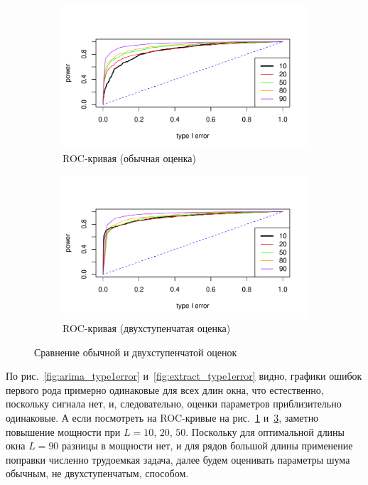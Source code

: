 \documentclass[specialist,
substylefile = spbu_report.rtx,
subf,href,colorlinks=true, 12pt]{disser}
\theoremstyle{definition}
\begin{document}
\begin{figure}[h!]
\begin{subfigure}[t]{0.5\textwidth}
		\includegraphics[width=\textwidth]{img/roc_arima.pdf}
		\caption{ROC-кривая (обычная оценка)}
		\label{fig:arima_roc}
	\end{subfigure}\hspace{\fill}
	\begin{subfigure}[t]{0.5\textwidth}
		\centering
		\includegraphics[width=\textwidth]{img/roc_extract.pdf}
		\caption{ROC-кривая (двухступенчатая оценка)}
		\label{fig:extract_roc}
	\end{subfigure}
	\caption{Сравнение обычной и двухступенчатой оценок}
\end{figure}

По рис.~\ref{fig:arima_type1error} и~\ref{fig:extract_type1error} видно, графики ошибок первого рода примерно одинаковые для всех длин окна, что естественно, поскольку сигнала нет, и, следовательно, оценки параметров приблизительно одинаковые. А если посмотреть на ROC-кривые на рис.~\ref{fig:arima_roc} и~\ref{fig:extract_roc}, заметно повышение мощности при $L=10$, $20$, $50$. Поскольку для оптимальной длины окна $L=90$ разницы в мощности нет, и для рядов большой длины применение поправки численно трудоемкая задача, далее будем оценивать параметры шума обычным, не двухступенчатым, способом.
\end{document}
